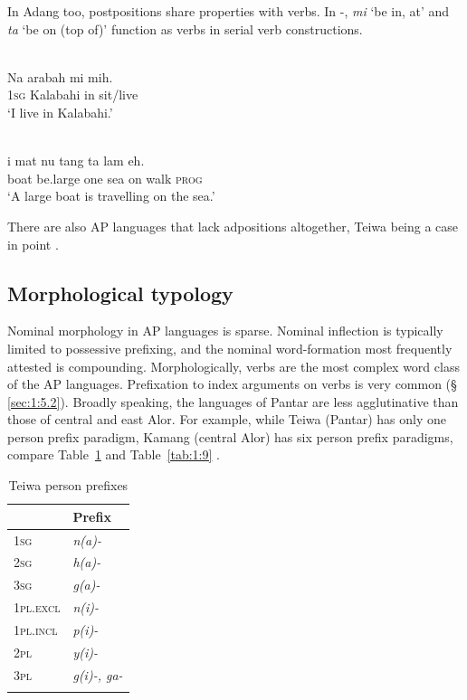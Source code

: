 


In Adang too, postpositions share properties with verbs. In -, \textit{mi} `be in, at' and \textit{ta} `be on (top of)' function as verbs in serial verb constructions. 



\ea%
\label{ex:1:31}
\\
\gll Na  {\textglotstop}arabah  mi  mih. \\
\textsc{1sg} Kalabahi  in   sit/live      \\
\glt `I live in Kalabahi.' 
\z
 

\ea%
\label{ex:1:32}
\\
\gll 
{\textepsilon}i  mat{\textepsilon}  nu  tang  ta  lam{\textepsilon} eh.  \\
 boat  be.large  one  sea  on  walk  \textsc{prog}   \\
\glt `A large boat is travelling on the sea.'
\z

 
There are also AP languages that lack adpositions altogether, Teiwa being a case in point \citep{Klamer2010grammar}. 

\subsection{Morphological typology} \label{sec:1:5.7}
Nominal morphology in AP languages is sparse. Nominal inflection is typically limited to possessive prefixing, and the nominal word-formation most frequently attested is compounding. Morphologically, verbs are the most complex word class of the AP languages. Prefixation to index arguments on verbs is very common ({\S} \ref{sec:1:5.2}). Broadly speaking, the languages of Pantar are less agglutinative than those of central and east Alor. For example, while Teiwa (Pantar) has only one person prefix paradigm, Kamang (central Alor) has six person prefix paradigms, compare Table~\ref{tab:1:8} and Table~\ref{tab:1:9} \citep{FeddenEtAlTV}. 
 

\begin{table}


\begin{tabularx}{.75\textwidth}{XX} 
\lsptoprule
& Prefix\\
\midrule
{\scshape 1sg} & {\itshape n(a)-}\\
{\scshape 2sg} & {\itshape h(a)-}\\
{\scshape 3sg} & {\itshape g(a)-}\\
\midrule
{\scshape 1pl.excl} & {\itshape n(i)-}\\
{\scshape 1pl.incl} & {\itshape p(i)-}\\
{\scshape 2pl} & {\itshape y(i)-}\\
{\scshape 3pl} & {\itshape g(i)-, ga-}\\
\lspbottomrule
\end{tabularx}

\caption{Teiwa person prefixes \citep[77, 78]{Klamer2010grammar}}
\label{tab:1:8}
\end{table}

